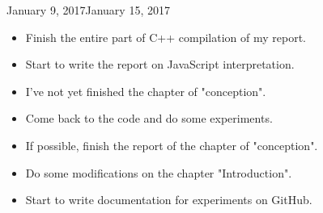 \begin{fichesuivi}{January 9, 2017}{January 15, 2017}

   \begin{travaileffectue}
        \begin{itemize}
            \item Finish the entire part of C++ compilation of my report.
            \item Start to write the report on JavaScript interpretation.
        \end{itemize}
   \end{travaileffectue}

   \begin{travailnoneffectue}
        \begin{itemize}
             \item I've not yet finished the chapter of "conception".
        \end{itemize}
   \end{travailnoneffectue}

 
   \begin{planification}
        \begin{itemize}
            \item Come back to the code and do some experiments.
            \item If possible, finish the report of the chapter of "conception".
            \item Do some modifications on the chapter "Introduction".
            \item Start to write documentation for experiments on GitHub.
        \end{itemize}
   \end{planification}
\end{fichesuivi}




